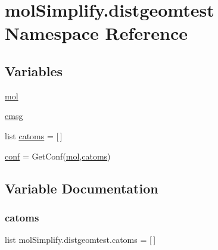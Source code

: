 \hypertarget{namespacemolSimplify_1_1distgeomtest}{}\section{mol\+Simplify.\+distgeomtest Namespace Reference}
\label{namespacemolSimplify_1_1distgeomtest}
\subsection*{Variables}
\begin{DoxyCompactItemize}
\item 
\hyperlink{namespacemolSimplify_1_1distgeomtest_a5e28bb8bf7c7b3fb5448fc4b5b9c1a40}{mol}
\item 
\hyperlink{namespacemolSimplify_1_1distgeomtest_ac24be1a514e33c45680af41886bfb547}{emsg}
\item 
list \hyperlink{namespacemolSimplify_1_1distgeomtest_ac5885e0fbb6f960045fe4b660aaa1d4e}{catoms} = \mbox{[}$\,$\mbox{]}
\item 
\hyperlink{namespacemolSimplify_1_1distgeomtest_ac3209957d297047c4489d85e6202d022}{conf} = Get\+Conf(\hyperlink{namespacemolSimplify_1_1distgeomtest_a5e28bb8bf7c7b3fb5448fc4b5b9c1a40}{mol},\hyperlink{namespacemolSimplify_1_1distgeomtest_ac5885e0fbb6f960045fe4b660aaa1d4e}{catoms})
\end{DoxyCompactItemize}


\subsection{Variable Documentation}
\mbox{\label{namespacemolSimplify_1_1distgeomtest_ac5885e0fbb6f960045fe4b660aaa1d4e}} 
\subsubsection{\texorpdfstring{catoms}{catoms}}
{\footnotesize\ttfamily list mol\+Simplify.\+distgeomtest.\+catoms = \mbox{[}$\,$\mbox{]}}

\mbox{\label{namespacemolSimplify_1_1distgeomtest_ac3209957d297047c4489d85e6202d022}} 
